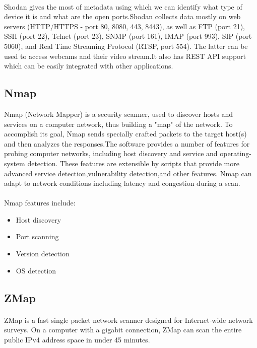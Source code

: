 \documentclass{report}
\begin{document}
\paragraph{}
Shodan gives the most of metadata using which we can identify what type of device it is and what are the open ports.Shodan collects data mostly on web servers (HTTP/HTTPS - port 80, 8080, 443, 8443), as well as FTP (port 21), SSH (port 22), Telnet (port 23), SNMP (port 161), IMAP (port 993), SIP (port 5060), and Real Time Streaming Protocol (RTSP, port 554). The latter can be used to access webcams and their video stream.It also has REST API support which can be easily integrated with other applications.

\subsection{Nmap}
Nmap (Network Mapper) is a security scanner, used to discover hosts and services on a computer network, thus building a "map" of the network. To accomplish its goal, Nmap sends specially crafted packets to the target host(s) and then analyzes the responses.The software provides a number of features for probing computer networks, including host discovery and service and operating-system detection. These features are extensible by scripts that provide more advanced service detection,vulnerability detection,and other features. Nmap can adapt to network conditions including latency and congestion during a scan.

\paragraph{}
Nmap features include:
\begin{itemize}
\item Host discovery
\item Port scanning 
\item Version detection
\item OS detection
\end{itemize}

\subsection{ZMap}
\paragraph{}
ZMap is a fast single packet network scanner designed for Internet-wide network surveys. On a computer with a gigabit connection, ZMap can scan the entire public IPv4 address space in under 45 minutes. 
\end{document}

